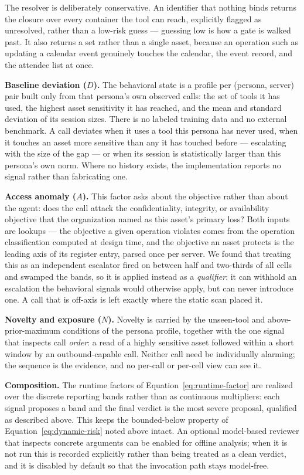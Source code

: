 \documentclass[sigconf]{acmart}
\begin{document}
The resolver is deliberately conservative. An identifier that nothing binds
returns the closure over every container the tool can reach, explicitly flagged
as unresolved, rather than a low-risk guess --- guessing low is how a gate is
walked past. It also returns a set rather than a single asset, because an
operation such as updating a calendar event genuinely touches the calendar, the
event record, and the attendee list at once.

\textbf{Baseline deviation ($D$).} The behavioral state is a profile per
(persona, server) pair built only from that persona's own observed calls: the
set of tools it has used, the highest asset sensitivity it has reached, and the
mean and standard deviation of its session sizes. There is no labeled training
data and no external benchmark. A call deviates when it uses a tool this persona
has never used, when it touches an asset more sensitive than any it has touched
before --- escalating with the size of the gap --- or when its session is
statistically larger than this persona's own norm. Where no history exists, the
implementation reports no signal rather than fabricating one.

\textbf{Access anomaly ($A$).} This factor asks about the objective rather than
about the agent: does the call attack the confidentiality, integrity, or
availability objective that the organization named as this asset's primary
loss? Both inputs are lookups --- the objective a given operation violates comes
from the operation classification computed at design time, and the objective an
asset protects is the leading axis of its register entry, parsed once per
server. We found that treating this as an independent escalator fired on
between half and two-thirds of all cells and swamped the bands, so it is
applied instead as a
\emph{qualifier}: it can withhold an escalation the behavioral signals would
otherwise apply, but can never introduce one. A call that is off-axis is left
exactly where the static scan placed it.

\textbf{Novelty and exposure ($N$).} Novelty is carried by the unseen-tool and
above-prior-maximum conditions of the persona profile, together with the one
signal that inspects call \emph{order}: a read of a highly sensitive asset
followed within a short window by an outbound-capable call. Neither call need be
individually alarming; the sequence is the evidence, and no per-call or
per-cell view can see it.

\textbf{Composition.} The runtime factors of Equation~\ref{eq:runtime-factor}
are realized over the discrete reporting bands rather than as continuous
multipliers: each signal proposes a band and the final verdict is the most
severe proposal, qualified as described above. This keeps the bounded-below
property of Equation~\ref{eq:dynamic-risk} noted above intact. An optional
model-based reviewer that inspects concrete arguments can be enabled for
offline analysis; when it is not run this is recorded explicitly rather than
being treated as a clean verdict, and it is disabled by default so that the
invocation path stays model-free.
\end{document}
